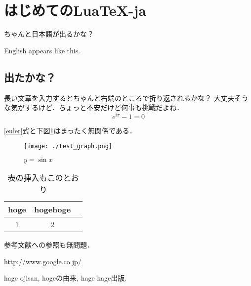 \documentclass{ltjsarticle}
\begin{document}
\section{はじめてのLua\TeX-ja}
ちゃんと日本語が出るかな？

English appears like this.

\subsection{出たかな？}
長い文章を入力するとちゃんと右端のところで折り返されるかな？
大丈夫そうな気がするけど．ちょっと不安だけど何事も挑戦だよね．
\begin{equation}
    \label{euler}
    e^{i\pi} - 1 = 0
\end{equation}

\eqref{euler}式と下図\ref{test_graph}はまったく無関係である．

\begin{figure}[H]
    \centering
    \texttt{[image: ./test\_graph.png]}
    \caption{$y=\sin x$}
    \label{test_graph}
\end{figure}

\begin{table}[H]
    \centering
    \caption{表の挿入もこのとおり}
    \begin{tabular}{ccc}
        \toprule
        hoge & hogehoge \\
        \midrule
        1 & 2 \\
        \bottomrule
    \end{tabular}
\end{table}

参考文献への参照も無問題．~\cite{text}

\url{http://www.google.co.jp/}

\begin{thebibliography}{9}
     hage ojisan, hogeの由来, hage hage出版.
\end{thebibliography}
\end{document}
